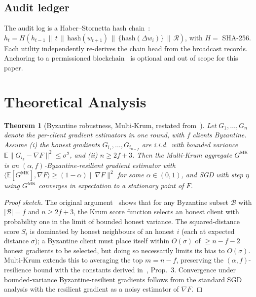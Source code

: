 \documentclass[conference]{IEEEtran}
\newtheorem{theorem}{Theorem}
\begin{document}
\subsection{Audit ledger}
The audit log is a Haber--Stornetta hash chain~\cite{haber1991timestamp}: $h_t = H(h_{t-1}\,\|\,t\,\|\,\mathrm{hash}(w_{t+1})\,\|\,\{\mathrm{hash}(\Delta w_i)\}\,\|\,\mathcal{R})$, with $H=$ SHA-256. Each utility independently re-derives the chain head from the broadcast records. Anchoring to a permissioned blockchain~\cite{kim2020blockfl,heiss2022offchain,smahi2024vflchain} is optional and out of scope for this paper.

\section{Theoretical Analysis}
\label{sec:theory}

\begin{theorem}[Byzantine robustness, Multi-Krum, restated from~\cite{blanchard2017krum}]
\label{thm:krum}
Let $G_1,\dots,G_n$ denote the per-client gradient estimators in one round, with $f$ clients Byzantine. Assume (i) the honest gradients $G_{i_1},\dots,G_{i_{n-f}}$ are i.i.d.\ with bounded variance $\mathbb{E}\|G_{i_k}-\nabla F\|^2 \le \sigma^2$, and (ii) $n \ge 2f + 3$. Then the Multi-Krum aggregate $G^{\mathrm{MK}}$ is an $(\alpha,f)$-Byzantine-resilient gradient estimator with $\langle \mathbb{E}[G^{\mathrm{MK}}], \nabla F \rangle \ge (1-\alpha)\|\nabla F\|^2$ for some $\alpha \in (0,1)$, and SGD with step $\eta$ using $G^{\mathrm{MK}}$ converges in expectation to a stationary point of $F$.
\end{theorem}

\begin{proof}[Proof sketch]
The original argument~\cite{blanchard2017krum} shows that for any Byzantine subset $\mathcal{B}$ with $|\mathcal{B}|=f$ and $n \ge 2f+3$, the Krum score function selects an honest client with probability one in the limit of bounded honest variance. The squared-distance score $S_i$ is dominated by honest neighbours of an honest $i$ (each at expected distance $\sigma$); a Byzantine client must place itself within $O(\sigma)$ of $\geq n-f-2$ honest gradients to be selected, but doing so necessarily limits its bias to $O(\sigma)$. Multi-Krum extends this to averaging the top $m=n-f$, preserving the $(\alpha,f)$-resilience bound with the constants derived in~\cite{blanchard2017krum}, Prop.~3. Convergence under bounded-variance Byzantine-resilient gradients follows from the standard SGD analysis with the resilient gradient as a noisy estimator of $\nabla F$.
\end{proof}
\end{document}

